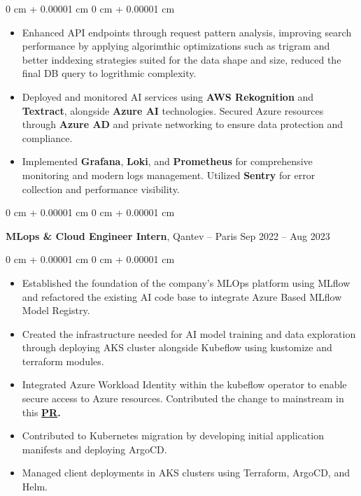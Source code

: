 \documentclass[10pt, letterpaper]{article}
\newenvironment{highlights}{ \begin{itemize}[ topsep=0.10 cm, parsep=0.10 cm, partopsep=0pt,
itemsep=0pt, leftmargin=0 cm + 10pt ] }{ \end{itemize} } %
\newenvironment{onecolentry}{ \begin{adjustwidth}{ 0 cm + 0.00001 cm }{ 0 cm + 0.00001 cm }
}{ \end{adjustwidth} } %
\newenvironment{twocolentry}[2][]{ \onecolentry \def\secondColumn{#2} \setcolumnwidth{\fill, 4.5 cm}
\begin{paracol}{2} }{ \switchcolumn \raggedleft \secondColumn \end{paracol}
\endonecolentry } %
\begin{document}
\begin{onecolentry}
\begin{highlights}
		\item Enhanced API endpoints through request pattern analysis, improving search performance by applying algorimthic optimizations such as trigram and better inddexing strategies suited for the data shape and size, reduced the final DB query to logrithmic complexity.

		\item Deployed and monitored AI services using \textbf{AWS Rekognition} and \textbf{Textract}, alongside \textbf{Azure AI} technologies. Secured Azure resources through \textbf{Azure AD} and private networking to ensure data protection and compliance.

		\item Implemented \textbf{Grafana}, \textbf{Loki}, and \textbf{Prometheus} for comprehensive monitoring and modern logs management. Utilized \textbf{Sentry} for error collection and performance visibility.
	\end{highlights}
\end{onecolentry}

\vspace{0.3 cm}

\begin{twocolentry}
	{ Sep 2022 – Aug 2023 } \textbf{MLops \& Cloud Engineer Intern}, Qantev --
	Paris
\end{twocolentry}

\vspace{0.10 cm}
\begin{onecolentry}
	\begin{highlights}
		\item Established the foundation of the company's MLOps platform using MLflow and refactored the existing AI code base to integrate Azure Based MLflow Model Registry.
		\item Created the infrastructure needed for AI model training and data exploration through deploying AKS cluster alongside Kubeflow using kustomize and terraform modules.
		\item Integrated Azure Workload Identity within the kubeflow operator to enable secure access to Azure resources. Contributed the change to mainstream in this \textbf{\href{https://github.com/kubeflow/kubeflow/pull/7091}{PR}.
		}
		\item Contributed to Kubernetes migration by developing initial application manifests and deploying ArgoCD.
		\item Managed client deployments in AKS clusters using Terraform, ArgoCD, and Helm.
	\end{highlights}
\end{onecolentry}
\end{document}
